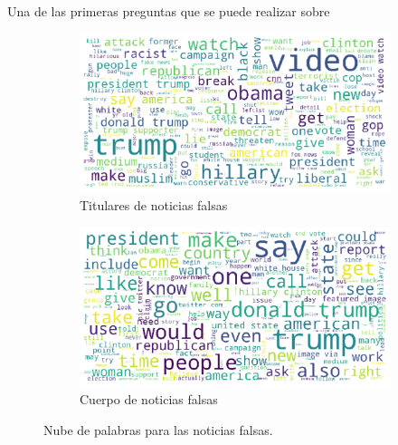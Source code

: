 {Una de las primeras preguntas que se puede realizar sobre
\begin{figure}
\centering
\begin{subfigure}{.47\textwidth}
    \centering
    \includegraphics[width=\textwidth]{imagenes/wordcloud_titulares_falsas.pdf}
    \caption{Titulares de noticias falsas}
    \label{fig:tit-fake}
\end{subfigure}%
\newline
\begin{subfigure}{.5\textwidth}
    \centering
    \includegraphics[width=\textwidth]{imagenes/wordclouds_cuerpo_falsas.pdf}
    \caption{Cuerpo de noticias falsas}
    \label{fig:text-fake}
\end{subfigure}
\caption{Nube de palabras para las noticias falsas.}
\label{fig:fake}
\end{figure}


}
